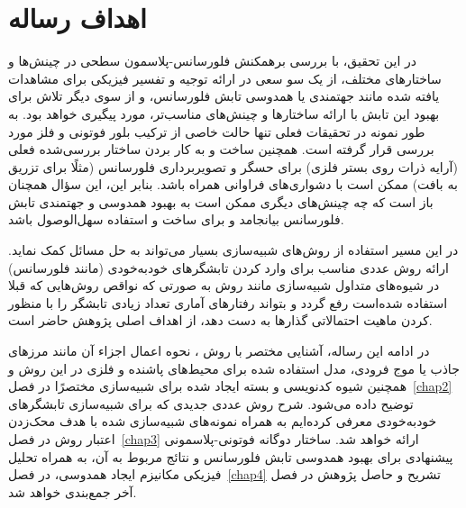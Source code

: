 \section{اهداف رساله}
در این تحقیق، با بررسی برهمکنش فلورسانس-پلاسمون سطحی در چینش‌ها و ساختارهای مختلف، از یک سو سعی در ارائه توجیه و تفسیر فیزیکی برای مشاهدات یافته شده مانند جهتمندی یا همدوسی تابش فلورسانس، و از سوی دیگر تلاش برای بهبود این تابش با ارائه ساختارها و چینش‌های مناسب‌تر، مورد پیگیری خواهد بود. 
به طور نمونه در تحقیقات فعلی تنها حالت خاصی از ترکیب بلور فوتونی و فلز مورد بررسی قرار گرفته است. همچنین ساخت و به کار بردن ساختار بررسی‌شده فعلی (آرایه ذرات روی بستر فلزی) برای حسگر و تصویربرداری فلورسانس (مثلًا برای تزریق به بافت) ممکن است با دشواری‌های فراوانی همراه باشد. بنابر این، این سؤال همچنان باز است که چه چینش‌های دیگری ممکن است به بهبود همدوسی و جهتمندی تابش فلورسانس بیانجامد و برای ساخت و استفاده سهل‌الوصول باشد.

در این مسیر استفاده از روش‌های شبیه‌سازی بسیار می‌تواند به حل مسائل کمک نماید. ارائه روش عددی مناسب برای وارد کردن تابشگرهای خود‌به‌خودی (مانند فلورسانس) در شیوه‌های متداول شبیه‌سازی مانند روش  به صورتی که نواقص روش‌هایی که قبلا استفاده شده‌است رفع گردد و بتواند رفتارهای آماری تعداد زیادی تابشگر را با منظور کردن ماهیت احتمالاتی گذارها به دست دهد، از اهداف اصلی پژوهش حاضر است.

در ادامه این رساله، آشنایی مختصر با روش ، نحوه اعمال اجزاء آن مانند مرزهای جاذب یا موج فرودی، مدل استفاده شده برای محیط‌های پاشنده و فلزی در این روش و همچنین شیوه کدنویسی و بسته ایجاد شده برای شبیه‌سازی مختصرًا در فصل~\ref{chap2} توضیح داده می‌شود. شرح روش عددی جدیدی که برای شبیه‌سازی تابشگرهای خودبه‌خودی معرفی کرده‌ایم به همراه نمونه‌های شبیه‌سازی شده با هدف محک‌زدن اعتبار روش در فصل~\ref{chap3} ارائه خواهد شد. ساختار دوگانه فوتونی-پلاسمونی پیشنهادی برای بهبود همدوسی تابش فلورسانس و نتائج مربوط به آن، به همراه تحلیل فیزیکی مکانیزم ایجاد همدوسی، در فصل~\ref{chap4} تشریح و حاصل پژوهش در فصل آخر جمع‌بندی خواهد شد.


